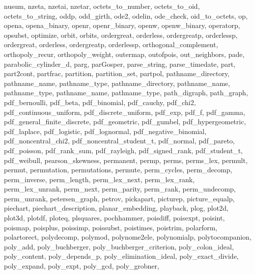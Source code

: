 {{    nusum,
    nzeta,
    nzetai,
    nzetar,
    octets_to_number,
    octets_to_oid,
    octets_to_string,
    oddp,
    odd_girth,
    ode2,
    odelin,
    ode_check,
    oid_to_octets,
    op,
    opena,
    opena_binary,
    openr,
    openr_binary,
    openw,
    openw_binary,
    operatorp,
    opsubst,
    optimize,
    orbit,
    orbits,
    ordergreat,
    orderless,
    ordergreatp,
    orderlessp,
    ordergreat,
    orderless,
    ordergreatp,
    orderlessp,
    orthogonal_complement,
    orthopoly_recur,
    orthopoly_weight,
    outermap,
    outofpois,
    out_neighbors,
    pade,
    parabolic_cylinder_d,
    parg,
    parGosper,
    parse_string,
    parse_timedate,
    part,
    part2cont,
    partfrac,
    partition,
    partition_set,
    partpol,
    pathname_directory,
    pathname_name,
    pathname_type,
    pathname_directory,
    pathname_name,
    pathname_type,
    pathname_name,
    pathname_type,
    path_digraph,
    path_graph,
    pdf_bernoulli,
    pdf_beta,
    pdf_binomial,
    pdf_cauchy,
    pdf_chi2,
    pdf_continuous_uniform,
    pdf_discrete_uniform,
    pdf_exp,
    pdf_f,
    pdf_gamma,
    pdf_general_finite_discrete,
    pdf_geometric,
    pdf_gumbel,
    pdf_hypergeometric,
    pdf_laplace,
    pdf_logistic,
    pdf_lognormal,
    pdf_negative_binomial,
    pdf_noncentral_chi2,
    pdf_noncentral_student_t,
    pdf_normal,
    pdf_pareto,
    pdf_poisson,
    pdf_rank_sum,
    pdf_rayleigh,
    pdf_signed_rank,
    pdf_student_t,
    pdf_weibull,
    pearson_skewness,
    permanent,
    permp,
    perms,
    perms_lex,
    permult,
    permut,
    permutation,
    permutations,
    permute,
    perm_cycles,
    perm_decomp,
    perm_inverse,
    perm_length,
    perm_lex_next,
    perm_lex_rank,
    perm_lex_unrank,
    perm_next,
    perm_parity,
    perm_rank,
    perm_undecomp,
    perm_unrank,
    petersen_graph,
    petrov,
    pickapart,
    picturep,
    picture_equalp,
    piechart,
    piechart_description,
    planar_embedding,
    playback,
    plog,
    plot2d,
    plot3d,
    plotdf,
    ploteq,
    plsquares,
    pochhammer,
    poisdiff,
    poisexpt,
    poisint,
    poismap,
    poisplus,
    poissimp,
    poissubst,
    poistimes,
    poistrim,
    polarform,
    polartorect,
    polydecomp,
    polymod,
    polynome2ele,
    polynomialp,
    polytocompanion,
    poly_add,
    poly_buchberger,
    poly_buchberger_criterion,
    poly_colon_ideal,
    poly_content,
    poly_depends_p,
    poly_elimination_ideal,
    poly_exact_divide,
    poly_expand,
    poly_expt,
    poly_gcd,
    poly_grobner,
}}

